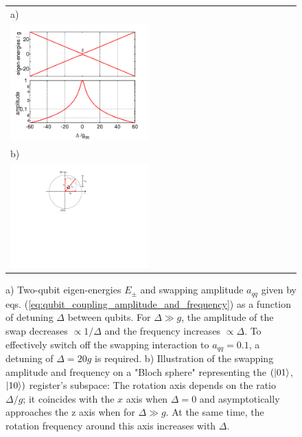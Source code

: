 \begin{figure}
	\centering
	\begin{tabular}{l}
	a) \\ \includegraphics[width=0.49\textwidth]{./material/mathematica/qubit_qubit_coupling} \\
	b) \\ \includegraphics[width=0.49\textwidth]{./material/figures/introduction/bloch_sphere_coupling_illustration}
	\end{tabular}
	\caption[]{a) Two-qubit eigen-energies $E_\pm$ and swapping amplitude $a_{qq}$ given by eqs. (\ref{eq:qubit_coupling_amplitude_and_frequency}) as a function of  detuning $\Delta$ between qubits. For $\Delta \gg g$, the amplitude of the swap decreases $\propto 1/\Delta$ and the frequency increases $\propto \Delta$. To effectively switch off the swapping interaction to $a_{qq}=0.1$, a detuning of $\Delta = 20 g$ is required. b) Illustration of the swapping amplitude and frequency on a "Bloch sphere" representing the $(\left| 01 \right>$,$\left| 10 \right>)$ register's subspace: The rotation axis depends on the ratio $\Delta/g$; it coincides with the $x$ axis when $\Delta=0$ and asymptotically approaches the z axis when for $\Delta \gg g$. At the same time, the rotation frequency around this axis increases with $\Delta$. }
	\label{fig:qubit_coupling_amplitude_and_frequency}
\end{figure}

